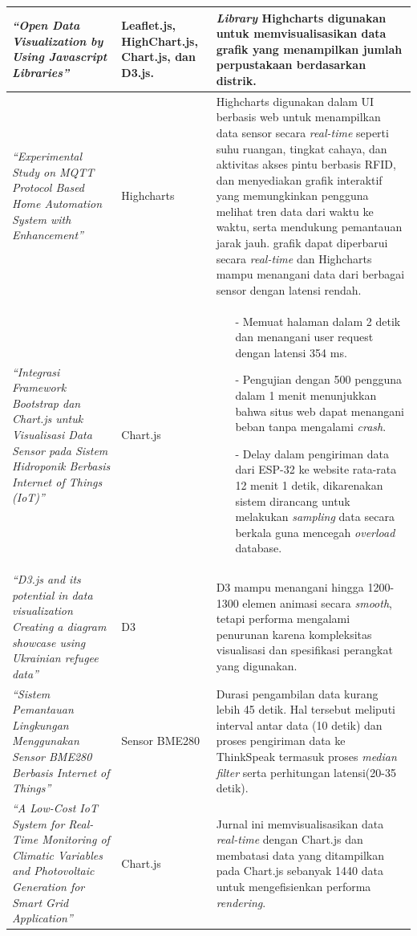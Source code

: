 \begin{longtable}{|p{}|
		p{}|
		p{}|}
	\textit{“Open Data Visualization by Using Javascript Libraries”} \cite{Vueti2023} &Leaflet.js, HighChart.js, Chart.js, dan D3.js. & \textit{Library} Highcharts digunakan untuk memvisualisasikan data grafik yang menampilkan jumlah perpustakaan berdasarkan distrik. \\ \hline
	\textit{“Experimental Study on MQTT Protocol Based Home Automation System with Enhancement”} \cite{Manna2024} & Highcharts & Highcharts digunakan dalam UI berbasis web untuk menampilkan data sensor secara \textit{real-time} seperti suhu ruangan, tingkat cahaya, dan aktivitas akses pintu berbasis RFID, dan menyediakan grafik interaktif yang memungkinkan pengguna melihat tren data dari waktu ke waktu, serta mendukung pemantauan jarak jauh. grafik dapat diperbarui secara \textit{real-time} dan Highcharts mampu menangani data dari berbagai sensor dengan latensi rendah.\\ \hline
	\textit{“Integrasi Framework Bootstrap dan Chart.js untuk Visualisasi Data Sensor pada Sistem Hidroponik Berbasis Internet of Things (IoT)”} \cite{Toppany2023} & Chart.js & 
	\begin{itemize}
		\item[-] Memuat halaman dalam 2 detik dan menangani user request dengan latensi 354 ms. 
		\item[-]  Pengujian dengan 500 pengguna dalam 1 menit menunjukkan bahwa situs web dapat menangani beban tanpa mengalami \textit{crash}.
		\item[-] Delay dalam pengiriman data dari ESP-32 ke website rata-rata 12 menit 1 detik, dikarenakan sistem dirancang untuk melakukan \textit{sampling} data secara berkala guna mencegah \textit{overload} database.
	\end{itemize} \\ \hline
	\textit{“D3.js and its potential in data visualization Creating a diagram showcase using Ukrainian refugee data”} \cite{Toppany2023} & D3 & 
	D3 mampu menangani hingga 1200-1300 elemen animasi secara \textit{smooth}, tetapi performa mengalami penurunan karena kompleksitas visualisasi dan spesifikasi perangkat yang digunakan. \\ \hline
	\textit{“Sistem Pemantauan Lingkungan Menggunakan Sensor BME280 Berbasis Internet of Things”} \cite{Toppany2023} & Sensor BME280 & 
	Durasi pengambilan data kurang lebih 45 detik. Hal tersebut meliputi interval antar data (10 detik) dan proses pengiriman data ke ThinkSpeak termasuk proses \textit{median filter} serta perhitungan latensi(20-35 detik). \\ \hline
	\textit{“A Low-Cost IoT System for Real-Time Monitoring of Climatic Variables and Photovoltaic Generation for Smart Grid Application”} \cite{Toppany2023} & Chart.js & 
	 Jurnal ini memvisualisasikan data \textit{real-time} dengan Chart.js dan membatasi data yang ditampilkan pada Chart.js sebanyak 1440 data untuk mengefisienkan performa \textit{rendering}. \\ \hline
\end{longtable}

